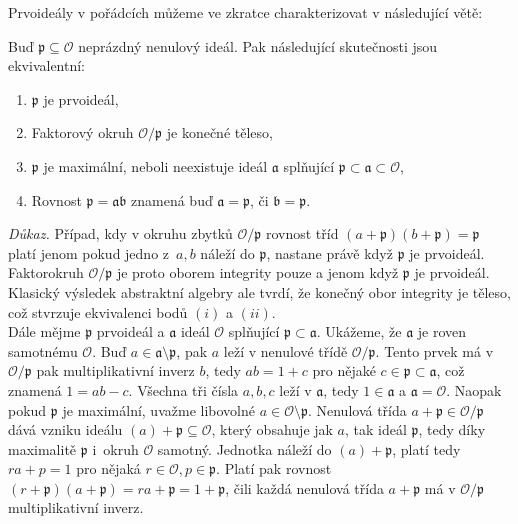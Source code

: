 \documentclass [12pt]{report}
\begin{document}
Prvoideály v pořádcích můžeme ve zkratce charakterizovat v následující větě:
\begin{veta}\label{prvoid}
Buď $\mathfrak{p} \subseteq \mathcal{O}$ neprázdný nenulový ideál. Pak následující skutečnosti jsou ekvivalentní:
\begin{enumerate}
\item $\mathfrak{p}$ je prvoideál,
\item Faktorový okruh $\mathcal{O}/\mathfrak{p}$ je konečné těleso,
\item $\mathfrak{p}$ je maximální, neboli neexistuje ideál $\mathfrak{a}$ splňující $\mathfrak{p} \subset \mathfrak{a} \subset \mathcal{O}$,
\item Rovnost $\mathfrak{p} = \mathfrak{a} \mathfrak{b}$ znamená buď $\mathfrak{a} = \mathfrak{p}$, či $\mathfrak{b} = \mathfrak{p}$.
\end{enumerate} 
\end{veta}
\textit{Důkaz.} Případ, kdy v okruhu zbytků $\mathcal{O}/\mathfrak{p}$ rovnost tříd $(a+\mathfrak{p})(b+\mathfrak{p}) = \mathfrak{p}$ platí jenom pokud jedno z~$a,b$ náleží do $\mathfrak{p}$, nastane právě když $\mathfrak{p}$ je prvoideál. Faktorokruh $\mathcal{O}/\mathfrak{p}$ je proto oborem integrity pouze a jenom když $\mathfrak{p}$ je prvoideál. Klasický výsledek abstraktní algebry ale tvrdí, že konečný obor integrity je těleso, což stvrzuje ekvivalenci bodů $(i)$ a $(ii)$.\\

Dále mějme $\mathfrak{p}$ prvoideál a $\mathfrak{a}$ ideál $\mathcal{O}$ splňující $\mathfrak{p} \subset \mathfrak{a}$. Ukážeme, že $\mathfrak{a}$ je roven samotnému $\mathcal{O}$. Buď $a \in \mathfrak{a} \setminus \mathfrak{p}$, pak $a$ leží v nenulové třídě $\mathcal{O}/\mathfrak{p}$. Tento prvek má v $\mathcal{O}/\mathfrak{p}$ pak multiplikativní inverz $b$, tedy $ab=1+c$ pro nějaké $c \in \mathfrak{p} \subset \mathfrak{a}$, což znamená $1 = ab-c$. Všechna tři čísla $a,b,c$ leží v $\mathfrak{a}$, tedy $1 \in \mathfrak{a}$ a $\mathfrak{a} = \mathcal{O}$. Naopak pokud $\mathfrak{p}$ je maximální, uvažme libovolné $a \in \mathcal{O}\setminus\mathfrak{p}$. Nenulová třída $a+\mathfrak{p} \in \mathcal{O}/\mathfrak{p}$ dává vzniku ideálu $(a)+\mathfrak{p} \subseteq \mathcal{O}$, který obsahuje jak $a$, tak ideál $\mathfrak{p}$, tedy díky maximalitě $\mathfrak{p}$ i~okruh $\mathcal{O}$ samotný. Jednotka náleží do $(a)+\mathfrak{p}$, platí tedy $ra+p = 1$ pro nějaká $r \in \mathcal{O}, p \in \mathfrak{p}$. Platí pak rovnost $(r+\mathfrak{p})(a+\mathfrak{p}) = ra+\mathfrak{p} = 1+\mathfrak{p}$, čili každá nenulová třída $a+\mathfrak{p}$ má v $\mathcal{O}/\mathfrak{p}$ multiplikativní inverz.\\
\end{document}
